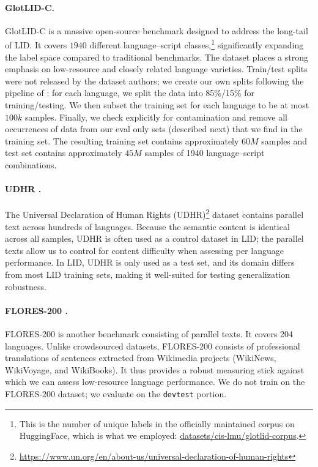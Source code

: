 \documentclass{article}
\begin{document}
\paragraph{GlotLID-C.}
GlotLID-C \cite{kargaran-etal-2023-glotlid} is a massive open-source benchmark designed to address the long-tail of LID. 
It covers $1940$ different language--script classes,\footnote{This is the number of unique labels in the officially maintained corpus on HuggingFace, which is what we employed: \href{https://huggingface.co/datasets/cis-lmu/glotlid-corpus}{datasets/cis-lmu/glotlid-corpus}.} significantly expanding the label space compared to traditional benchmarks.  
The dataset places a strong emphasis on low-resource and closely related language varieties. 
Train/test splits were not released by the dataset authors; we create our own splits following the pipeline of \citet{foroutan2025conlid}: for each language, we split the data into 85\%/15\% for training/testing. 
We then subset the training set for each language to be at most $100k$ samples. Finally, we check explicitly for contamination and remove all occurrences of data from our eval only sets (described next) that we find in the training set. The resulting training set contains approximately $60M$ samples and test set contains approximately $45M$ samples of 1940 language--script combinations.

\paragraph{UDHR \citep[eval only;][]{Vatanen10LREC}.}
The Universal Declaration of Human Rights (UDHR)\footnote{\url{https://www.un.org/en/about-us/universal-declaration-of-human-rights}} dataset contains parallel text across hundreds of languages. 
Because the semantic content is identical across all samples, UDHR is often used as a control dataset in LID; the parallel texts allow us to control for content difficulty when assessing per language performance. 
In LID, UDHR is only used as a test set, and its domain differs from most LID training sets, making it well-suited for testing generalization robustness.   

\paragraph{FLORES-200 \citep[eval only;][]{nllb2022}.} 
FLORES-200  is another benchmark consisting of parallel texts. It covers 204 languages. 
Unlike crowdsourced datasets, FLORES-200 consists of professional translations of sentences extracted from Wikimedia projects (WikiNews, WikiVoyage, and WikiBooks). 
It thus provides a robust measuring stick against which we can assess low-resource language performance. We do not train on the FLORES-200 dataset; we evaluate on the \texttt{devtest} portion.
\end{document}
